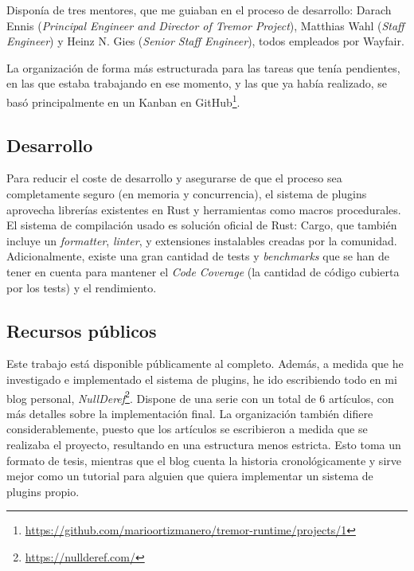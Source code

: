 Disponía de tres mentores, que me guiaban en el proceso de desarrollo: Darach
Ennis (\emph{Principal Engineer and Director of Tremor Project}), Matthias Wahl
(\emph{Staff Engineer}) y Heinz N. Gies (\emph{Senior Staff Engineer}), todos
empleados por Wayfair.

La organización de forma más estructurada para las tareas que tenía pendientes,
en las que estaba trabajando en ese momento, y las que ya había realizado, se
basó principalmente en un Kanban en
GitHub\footnote{\url{https://github.com/marioortizmanero/tremor-runtime/projects/1}}.

\subsection{Desarrollo}

Para reducir el coste de desarrollo y asegurarse de que el proceso sea
completamente seguro (en memoria y concurrencia), el sistema de plugins
aprovecha librerías existentes en Rust y herramientas como macros procedurales.
El sistema de compilación usado es solución oficial de Rust: Cargo, que también
incluye un \emph{formatter}, \emph{linter}, y extensiones instalables creadas
por la comunidad. Adicionalmente, existe una gran cantidad de tests y
\emph{benchmarks} que se han de tener en cuenta para mantener el \emph{Code
Coverage} (la cantidad de código cubierta por los tests) y el rendimiento.

\subsection{Recursos públicos}

Este trabajo está disponible públicamente al completo. Además, a medida que he
investigado e implementado el sistema de plugins, he ido escribiendo todo en mi
blog personal, \emph{NullDeref}\footnote{\url{https://nullderef.com/}}. Dispone
de una serie con un total de 6 artículos, con más detalles sobre la
implementación final. La organización también difiere considerablemente, puesto
que los artículos se escribieron a medida que se realizaba el proyecto,
resultando en una estructura menos estricta. Esto toma un formato de tesis,
mientras que el blog cuenta la historia cronológicamente y sirve mejor como un
tutorial para alguien que quiera implementar un sistema de plugins propio.

